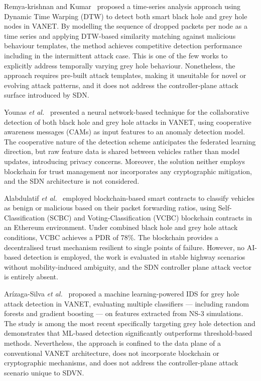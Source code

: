 \documentclass[12pt, a4paper]{report}
\begin{document}
Remya-krishnan and Kumar~\cite{remyakrishnan2022dtw} proposed a time-series
analysis approach using Dynamic Time Warping (DTW) to detect both smart black
hole and grey hole nodes in VANET. By modelling the sequence of dropped packets
per node as a time series and applying DTW-based similarity matching against
malicious behaviour templates, the method achieves competitive detection
performance including in the intermittent attack case. This is one of the few
works to explicitly address temporally varying grey hole behaviour. Nonetheless,
the approach requires pre-built attack templates, making it unsuitable for
novel or evolving attack patterns, and it does not address the controller-plane
attack surface introduced by SDN.

Younas \textit{et al.}~\cite{younas2022collaborative} presented a neural
network-based technique for the collaborative detection of both black hole and
grey hole attacks in VANET, using cooperative awareness messages (CAMs) as
input features to an anomaly detection model. The cooperative nature of the
detection scheme anticipates the federated learning direction, but raw feature
data is shared between vehicles rather than model updates, introducing privacy
concerns. Moreover, the solution neither employs blockchain for trust management
nor incorporates any cryptographic mitigation, and the SDN architecture is not
considered.

Alabdulatif \textit{et al.}~\cite{alabdulatif2024mitigating} employed
blockchain-based smart contracts to classify vehicles as benign or malicious
based on their packet forwarding ratios, using Self-Classification (SCBC) and
Voting-Classification (VCBC) blockchain contracts in an Ethereum environment.
Under combined black hole and grey hole attack conditions, VCBC achieves a PDR
of 78\%. The blockchain provides a decentralised trust mechanism resilient to
single points of failure. However, no AI-based detection is employed, the work
is evaluated in stable highway scenarios without mobility-induced ambiguity, and
the SDN controller plane attack vector is entirely absent.

Arízaga-Silva \textit{et al.}~\cite{arizagasilva2025ml} proposed a machine
learning-powered IDS for grey hole attack detection in VANET, evaluating
multiple classifiers — including random forests and gradient boosting — on
features extracted from NS-3 simulations. The study is among the most recent
specifically targeting grey hole detection and demonstrates that ML-based
detection significantly outperforms threshold-based methods. Nevertheless, the
approach is confined to the data plane of a conventional VANET architecture,
does not incorporate blockchain or cryptographic mechanisms, and does not address
the controller-plane attack scenario unique to SDVN.
\end{document}
